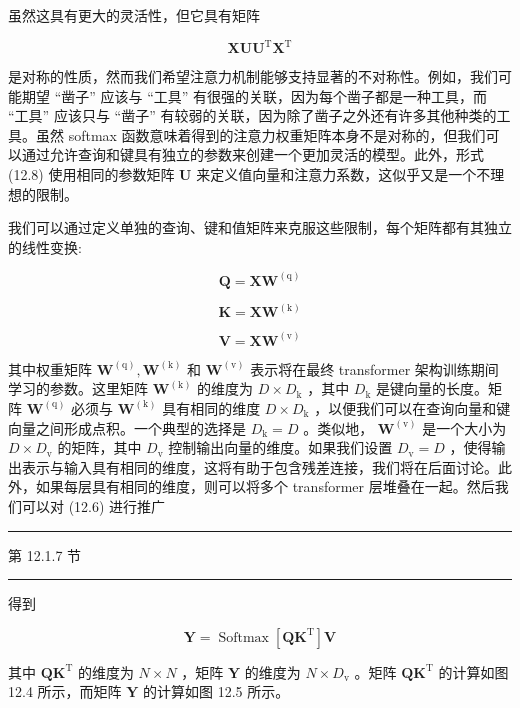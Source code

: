 \documentclass[10pt]{report}
\newcommand{\HRule}{\begin{center}\rule{0.9\linewidth}{0.2mm}\end{center}}
\begin{document}
虽然这具有更大的灵活性，但它具有矩阵

\[
\mathbf{{XU}}{\mathbf{U}}^{\mathrm{T}}{\mathbf{X}}^{\mathrm{T}} \tag{12.9}
\]

是对称的性质，然而我们希望注意力机制能够支持显著的不对称性。例如，我们可能期望 “凿子” 应该与 “工具” 有很强的关联，因为每个凿子都是一种工具，而 “工具” 应该只与 “凿子” 有较弱的关联，因为除了凿子之外还有许多其他种类的工具。虽然 softmax 函数意味着得到的注意力权重矩阵本身不是对称的，但我们可以通过允许查询和键具有独立的参数来创建一个更加灵活的模型。此外，形式 (12.8) 使用相同的参数矩阵 \(\mathbf{U}\) 来定义值向量和注意力系数，这似乎又是一个不理想的限制。

我们可以通过定义单独的查询、键和值矩阵来克服这些限制，每个矩阵都有其独立的线性变换:

\[
\mathbf{Q} = {\mathbf{{XW}}}^{\left( \mathrm{q}\right) } \tag{12.10}
\]

\[
\mathbf{K} = \mathbf{X}{\mathbf{W}}^{\left( \mathrm{k}\right) } \tag{12.11}
\]

\[
\mathbf{V} = \mathbf{X}{\mathbf{W}}^{\left( \mathrm{v}\right) } \tag{12.12}
\]

其中权重矩阵 \({\mathbf{W}}^{\left( \mathrm{q}\right) },{\mathbf{W}}^{\left( \mathrm{k}\right) }\) 和 \({\mathbf{W}}^{\left( \mathrm{v}\right) }\) 表示将在最终 transformer 架构训练期间学习的参数。这里矩阵 \({\mathbf{W}}^{\left( \mathrm{k}\right) }\) 的维度为 \(D \times  {D}_{\mathrm{k}}\) ，其中 \({D}_{\mathrm{k}}\) 是键向量的长度。矩阵 \({\mathbf{W}}^{\left( \mathrm{q}\right) }\) 必须与 \({\mathbf{W}}^{\left( \mathrm{k}\right) }\) 具有相同的维度 \(D \times  {D}_{\mathrm{k}}\) ，以便我们可以在查询向量和键向量之间形成点积。一个典型的选择是 \({D}_{\mathrm{k}} = D\) 。类似地， \({\mathbf{W}}^{\left( \mathrm{v}\right) }\) 是一个大小为 \(D \times  {D}_{\mathrm{v}}\) 的矩阵，其中 \({D}_{\mathrm{v}}\) 控制输出向量的维度。如果我们设置 \({D}_{\mathrm{v}} = D\) ，使得输出表示与输入具有相同的维度，这将有助于包含残差连接，我们将在后面讨论。此外，如果每层具有相同的维度，则可以将多个 transformer 层堆叠在一起。然后我们可以对 (12.6) 进行推广

\HRule

第 12.1.7 节

\HRule

得到

\[
\mathbf{Y} = \operatorname{Softmax}\left\lbrack  {\mathbf{{QK}}}^{\mathrm{T}}\right\rbrack  \mathbf{V} \tag{12.13}
\]

其中 \(\mathbf{Q}{\mathbf{K}}^{\mathrm{T}}\) 的维度为 \(N \times  N\) ，矩阵 \(\mathbf{Y}\) 的维度为 \(N \times  {D}_{\mathrm{v}}\) 。矩阵 \(\mathbf{Q}{\mathbf{K}}^{\mathrm{T}}\) 的计算如图 12.4 所示，而矩阵 \(\mathbf{Y}\) 的计算如图 12.5 所示。
\end{document}
